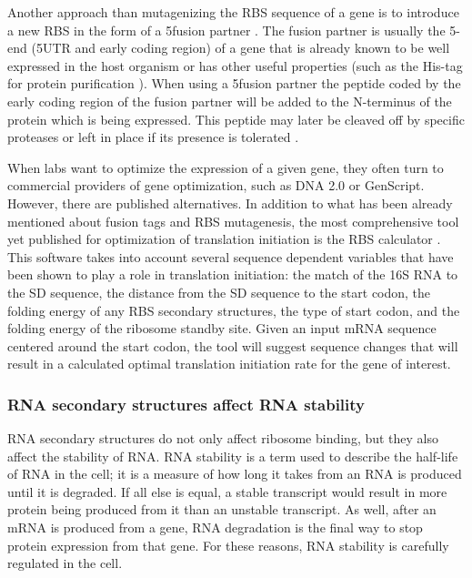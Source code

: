 Another approach than mutagenizing the RBS sequence of a gene is to introduce a
new RBS in the form of a 5\ppp fusion partner \cite{lavallie_gene_1995}. The
fusion partner is usually the 5\ppp-end (5\ppp UTR and early coding region) of
a gene that is already known to be well expressed in the host organism or has
other useful properties (such as the His-tag for protein purification
\cite{cebe_rapid_2006}). When using a 5\ppp fusion partner the peptide coded by
the early coding region of the fusion partner will be added to the N-terminus
of the protein which is being expressed. This peptide may later be cleaved off
by specific proteases or left in place if its presence is tolerated
\cite{esposito_enhancement_2006}.

When labs want to optimize the expression of a given gene, they often turn to
commercial providers of gene optimization, such as DNA 2.0 or GenScript.
However, there are published alternatives. In addition to what has been already
mentioned about fusion tags and RBS mutagenesis, the most comprehensive tool
yet published for optimization of translation initiation is the RBS calculator
\cite{salis_automated_2009}. This software takes into account several sequence
dependent variables that have been shown to play a role in translation
initiation: the match of the 16S RNA to the SD sequence, the distance from the
SD sequence to the start codon, the folding energy of any RBS secondary
structures, the type of start codon, and the folding energy of the ribosome
standby site. Given an input mRNA sequence centered around the start codon, the
tool will suggest sequence changes that will result in a calculated optimal
translation initiation rate for the gene of interest.

\subsubsection{RNA secondary structures affect RNA stability}
RNA secondary structures do not only affect ribosome binding, but they also
affect the stability of RNA. RNA stability is a term used to describe the
half-life of RNA in the cell; it is a measure of how long it takes from an RNA
is produced until it is degraded. If all else is equal, a stable transcript
would result in more protein being produced from it than an unstable
transcript. As well, after an mRNA is produced from a gene, RNA degradation is
the final way to stop protein expression from that gene. For these reasons, RNA
stability is carefully regulated in the cell.

